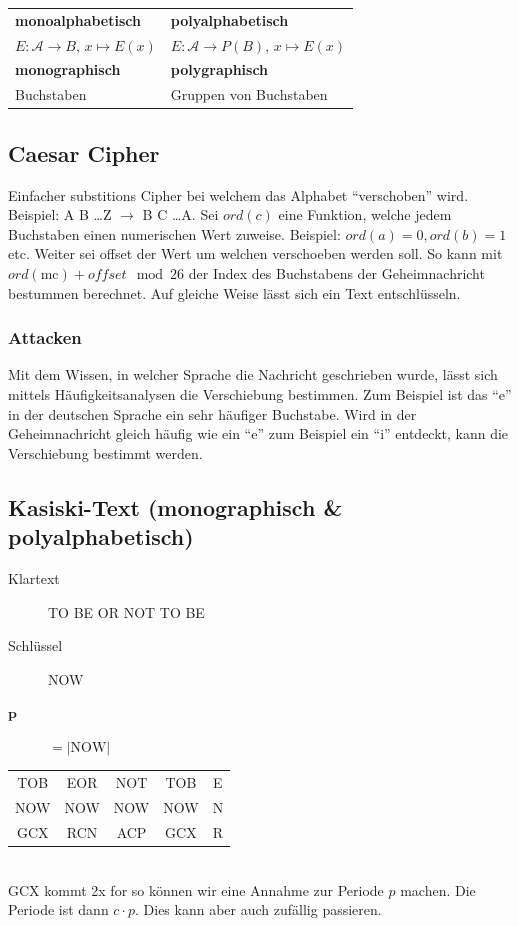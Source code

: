 \documentclass[10pt]{article}
\newcommand{\Pota}{\mathcal{A}}
\newcommand{\Bold}[1]{\textbf{#1}} %
\newcommand{\T}[1]{\text{#1}} %
\newcommand{\ra}{\rightarrow}
\newcommand{\Abs}[1]{\left| #1 \right|} %
\begin{document}
\begin{tabular}{l|l}
 \Bold{monoalphabetisch}&\Bold{polyalphabetisch}\\
 $E:\Pota\ra B$, $x\mapsto E(x)$&$E:\Pota\ra P(B)$, $x\mapsto E(x)$\\\hline
 \Bold{monographisch}&\Bold{polygraphisch}\\
 Buchstaben&Gruppen von Buchstaben
\end{tabular}

\subsection{Caesar Cipher}
Einfacher substitions Cipher bei welchem das Alphabet ``verschoben'' wird. Beispiel: A B \ldots Z $\rightarrow$ B C \ldots A. Sei $ord(c)$ eine Funktion, welche jedem Buchstaben einen numerischen Wert zuweise. Beispiel: $ord(a) = 0, ord(b) = 1$ etc. Weiter sei offset der Wert um welchen verschoeben werden soll. So kann mit $ord(\text{mc}) + offset \mod 26$ der Index des Buchstabens der Geheimnachricht bestummen berechnet. Auf gleiche Weise lässt sich ein Text entschlüsseln.

\subsubsection{Attacken}
Mit dem Wissen, in welcher Sprache die Nachricht geschrieben wurde, lässt sich mittels Häufigkeitsanalysen die Verschiebung bestimmen. Zum Beispiel ist das ``e'' in der deutschen Sprache ein sehr häufiger Buchstabe. Wird in der Geheimnachricht gleich häufig wie ein ``e'' zum Beispiel ein ``i'' entdeckt, kann die Verschiebung bestimmt werden.

\subsection{Kasiski-Text (monographisch \& polyalphabetisch)}
\begin{description}
	\item[Klartext] TO BE OR NOT TO BE
	\item[Schlüssel] NOW
	\item[$\mathbf{p}$] $=\Abs{\T{NOW}}$
\end{description}
\begin{tabular}{c|c|c|c|c}
 TOB&EOR&NOT&TOB&E\\
 NOW&NOW&NOW&NOW&N\\
 GCX&RCN&ACP&GCX&R
\end{tabular}\\
GCX kommt 2x for so können wir eine Annahme zur Periode $p$ machen. Die Periode ist dann $c\cdot p$. Dies kann aber auch zufällig passieren.
\end{document}
